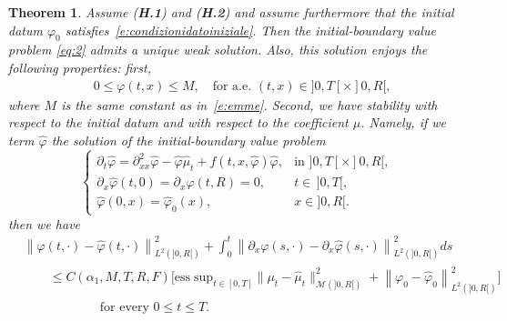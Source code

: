 \documentclass[11pt,leqno]{amsart}
\newtheorem{theorem}{Theorem}[section]
\numberwithin{equation}{section}
\begin{document}
\begin{theorem}
  \label{th:main1}
  Assume \emph{({\bf H.1})} and \emph{({\bf H.2})} and assume furthermore that the initial datum ${\varphi}_0$ satisfies~\eqref{e:condizionidatoiniziale}.
  Then the initial-boundary value problem \eqref{eq:2} admits a unique weak solution. Also, this solution enjoys the following 
  properties: first, 
  \begin{align}
    \label{eq:th2.1}
    &0\le {\varphi}(t,x) \le M ,\quad \text{for a.e.  $(t,x)\in ]0,T[ \times ]0,R[$},
   
   
  \end{align}
  where $M$ is the same constant as in~\eqref{e:emme}. Second, we have stability with respect to the initial datum and with respect to the coefficient $\mu$. Namely, if we term  
$\widehat{\varphi}$ the solution of the initial-boundary value problem
\begin{equation}
  \label{eq:fhicappuccio}
  \begin{cases}
    {\partial_t} \hat {\varphi} = {\partial_{xx}^2} \hat {\varphi} - \hat {\varphi} \hat \mu_t + f(t,x,\hat {\varphi}) \hat 
    {\varphi},
    & \text{in $]0, T[ \times ]0, R[$},
    \\
      {\partial_x } \hat {\varphi}(t,0)={\partial_x }  \hat {\varphi}(t,R) = 0, & t \in \, ]0, T[,
     \\
    \hat {\varphi}(0,x)=\hat {\varphi}_0(x),
    & x\in{]0,R[}.
  \end{cases}
\end{equation}
then  we have 
  \begin{equation}
    \label{e:stability2}
    \begin{split}
            & {\left\|{{\varphi}(t,\cdot)-  
            \widehat{\varphi}(t,\cdot)}\right\|}^2_{L^2(]0,R[)}+  
             \int_0^t  {\left\|{ \partial_x {\varphi}(s,\cdot) -  
             \partial_x \widehat{\varphi}(s,\cdot)}\right\|}^2_{L^2(]0,R[)}ds\\
    & \qquad \le 
    C(\alpha_1, M, T, R, F) 
    \Bigg[  \mathrm{ess \;sup}_{t \in [0, T]}
    \| \mu_t   - \hat \mu_t  \|^2_{\mathcal M(]0, R[)} + 
     {\left\|{{\varphi}_0-\widehat{\varphi}_0}\right\|}^2_{L^2(]0,R[)}  
     \Bigg]
     \\
    &  \qquad \qquad \qquad 
    \text{for every $0\le t\le T$.} \phantom{\int} \\
\end{split}
  \end{equation} 
\end{theorem} 
\end{document}
